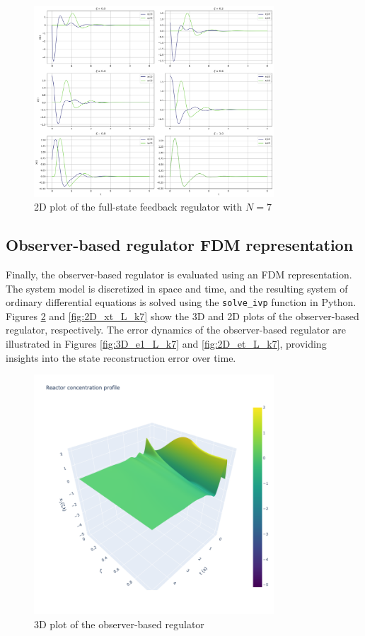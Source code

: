 \begin{figure}[H]
    \centering
    \includegraphics[width=0.8\textwidth]{Figures/2D_xt_k7.png}
    \caption{2D plot of the full-state feedback regulator with $N=7$}
    \label{fig:2D_xt_k7}
\end{figure}

\subsection{Observer-based regulator FDM representation}

Finally, the observer-based regulator is evaluated using an FDM representation. The system model is discretized in space and time, and the resulting system of ordinary differential equations is solved using the \texttt{solve\_ivp} function in Python. Figures \ref{fig:3D_x1_L_k7} and \ref{fig:2D_xt_L_k7} show the 3D and 2D plots of the observer-based regulator, respectively. The error dynamics of the observer-based regulator are illustrated in Figures \ref{fig:3D_e1_L_k7} and \ref{fig:2D_et_L_k7}, providing insights into the state reconstruction error over time.

\begin{figure}[H]
    \centering
    \includegraphics[width=0.8\textwidth]{Figures/3D_x1_L_k7.png}
    \caption{3D plot of the observer-based regulator}
    \label{fig:3D_x1_L_k7}
\end{figure}

